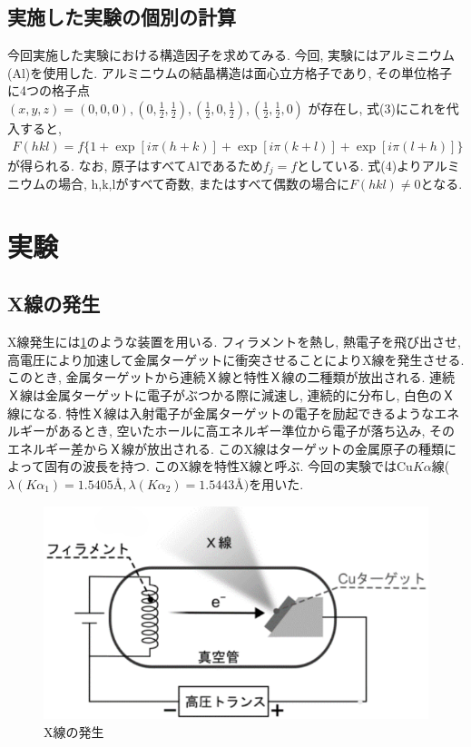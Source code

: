 \documentclass[11pt]{ltjsarticle}
\begin{document}
    \subsection*{実施した実験の個別の計算}
      今回実施した実験における構造因子を求めてみる.
      今回, 実験にはアルミニウム(Al)を使用した. アルミニウムの結晶構造は面心立方格子であり, その単位格子に4つの格子点\\
      $(x,y,z)=(0,0,0),(0,\frac{1}{2},\frac{1}{2}),(\frac{1}{2},0,\frac{1}{2}),(\frac{1}{2},\frac{1}{2},0)$
      が存在し, 式(3)にこれを代入すると, 
      \begin{gather}
        F(hkl)=f \{1+\exp[i\pi (h+k)]+\exp[i\pi (k+l)]+\exp[i\pi (l+h)]\}
      \end{gather}
      が得られる.
      なお, 原子はすべてAlであるため$f_j =f$としている. 式(4)よりアルミニウムの場合, h,k,lがすべて奇数, またはすべて偶数の場合に$F(hkl)\not= 0$となる.
  \section*{実験}
    \subsection*{X線の発生}
      X線発生には{\cref{fig:xrayapper}}のような装置を用いる. フィラメントを熱し, 熱電子を飛び出させ, 高電圧により加速して金属ターゲットに衝突させることによりX線を発生させる. 
      このとき, 金属ターゲットから連続Ｘ線と特性Ｘ線の二種類が放出される. 連続Ｘ線は金属ターゲットに電子がぶつかる際に減速し, 連続的に分布し, 白色のＸ線になる. 特性Ｘ線は入射電子が金属ターゲットの電子を励起できるようなエネルギーがあるとき, 空いたホールに高エネルギー準位から電子が落ち込み, そのエネルギー差からＸ線が放出される. このX線はターゲットの金属原子の種類によって固有の波長を持つ. このX線を特性X線と呼ぶ. 
      今回の実験では$\mathrm{Cu}K\alpha$線($\lambda(K\alpha_1)={1.5405}{\text{\AA}},\lambda(K\alpha_2)={1.5443}\text{\AA})$を用いた.
      \begin{figure}[H]
        \centering
        \includegraphics[width=0.4\columnwidth]{xrayapper.png}
        \caption{X線の発生}
        \label{fig:xrayapper}
      \end{figure}
\end{document}
